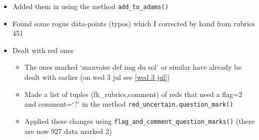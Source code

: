 \documentclass[12pt]{article}
\begin{document}
\begin{itemize}
    \item Added them in using the method \texttt{add\_to\_adams()}
    \item Found some rogue data-points (typos) which I corrected by hand from rubrics 451
    \item Dealt with red ones
    \begin{itemize}
        \item The ones marked `mauvaise def img du sol' or similar have already be dealt with earlier (on wed 3 jul see \ref{wed 3 jul})
        \item Made a list of tuples (fk\_rubrics,comment) of reds that need a flag=2 and comment=`?' in the method \texttt{red\_uncertain.question\_mark()}
        \item Applied these changes using \texttt{flag\_and\_comment\_question\_marks()} (there are now 927 data marked 2)
    \end{itemize}
\end{itemize}
\end{document}
